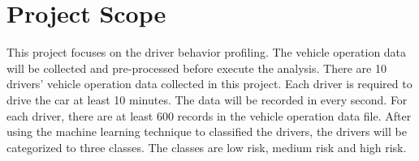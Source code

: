 \section{Project Scope}
This project focuses on the driver behavior profiling. The vehicle operation data will be collected and pre-processed before execute the analysis. There are 10 drivers' vehicle operation data collected in this project. Each driver is required to drive the car at least 10 minutes. The data will be recorded in every second. For each driver, there are at least 600 records in the vehicle operation data file. After using the machine learning technique to classified the drivers, the drivers will be categorized to three classes. The classes are low risk, medium risk and high risk. 
 